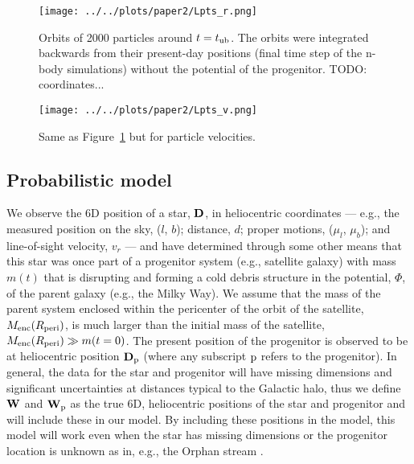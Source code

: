 \documentclass[letterpaper,12pt,preprint]{aastex}
\newcommand{\D}{{\bf D}}
\newcommand{\W}{{\bf W}}
\newcommand{\sat}{{\rm p}}
\newcommand{\tub}{t_{\rm ub}}
\begin{document}
\begin{figure}[h]
\begin{center}
\texttt{[image: ../../plots/paper2/Lpts\_r.png]}
\caption{ Orbits of 2000 particles around $t=\tub$. The orbits were integrated backwards from their present-day positions (final time step of the n-body simulations) without the potential of the progenitor. TODO: coordinates...}\label{fig:lpts_r}
\end{center}
\end{figure}

\begin{figure}[h]
\begin{center}
\texttt{[image: ../../plots/paper2/Lpts\_v.png]}
\caption{ Same as Figure~\ref{fig:lpts_r} but for particle velocities. }\label{fig:lpts_v}
\end{center}
\end{figure}


\subsection{Probabilistic model}
We observe the 6D position of a star, $\D$, in heliocentric coordinates --- e.g., the measured position on the sky, ($l$, $b$); distance, $d$; proper motions, ($\mu_l$, $\mu_b$); and line-of-sight velocity, $v_r$ --- and have determined through some other means that this star was once part of a progenitor system (e.g., satellite galaxy) with mass $m(t)$ that is disrupting and forming a cold debris structure in the potential, $\Phi$, of the parent galaxy (e.g., the Milky Way). We assume that the mass of the parent system enclosed within the pericenter of the orbit of the satellite, $M_{\rm enc}(R_{\rm peri})$, is much larger than the initial mass of the satellite, $M_{\rm enc}(R_{\rm peri})\gg m(t=0)$. The present position of the progenitor is observed to be at heliocentric position $\D_\sat$ (where any subscript $\sat$ refers to the progenitor). In general, the data for the star and progenitor will have missing dimensions and significant uncertainties at distances typical to the Galactic halo, thus we define $\W$ and $\W_\sat$ as the true 6D, heliocentric positions of the star and progenitor and will include these in our model. By including these positions in the model, this model will work even when the star has missing dimensions or the progenitor location is unknown as in, e.g., the Orphan stream \citep{some orphan paper}.
\end{document}
